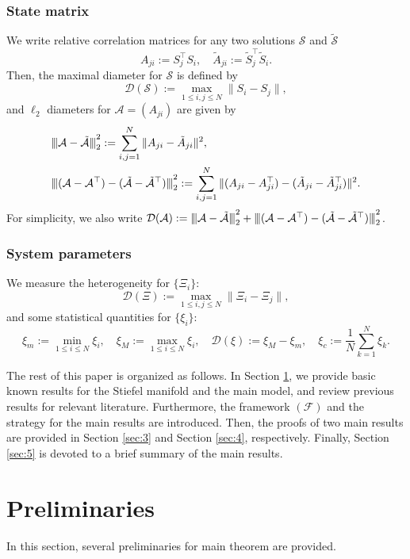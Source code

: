 \documentclass[11pt,reqno]{amsart}
\numberwithin{figure}{section}
\newcommand{\opnorm}[1]{{ \vert\kern-0.25ex \vert\kern-0.25ex \vert #1 
     \vert\kern-0.25ex \vert\kern-0.25ex \vert}}
\begin{document}
\subsubsection{State matrix} We write relative correlation matrices  for any two solutions $\mathcal S$ and $\tilde{\mathcal S}$
\[
A_{ji} := S_j^\top S_i,\quad \tilde A_{ji} := \tilde S_j^\top \tilde S_i.
\]
Then, the maximal diameter for $\mathcal S$ is defined by 
\[
\mathcal D(\mathcal S) := \max_{1\leq i,j \leq N} \|S_i -S_j\|,
\]
and $\ell_2$ diameters for $\mathcal A = (A_{ji})$ are given by
\begin{align*}
&\opnorm{\mathcal A- \tilde{\mathcal A}}_2^2:= \sum_{i,j=1}^N \|A_{ji} - \tilde A_{ji}\|^2, \\
&  \opnorm{(\mathcal A - \mathcal A^\top) - (\tilde{\mathcal A} - \tilde{\mathcal A}^\top)   }_2^2 := \sum_{i,j=1}^N \| (A_{ji} -  A_{ji}^\top) - (\tilde A_{ji} - \tilde A_{ji}^\top)\|^2 .
\end{align*}
For simplicity, we also write $\mathcal D(\mathcal A) := \opnorm{\mathcal A- \tilde{\mathcal A}}_2^2 + \opnorm{(\mathcal A - \mathcal A^\top) - (\tilde{\mathcal A} - \tilde{\mathcal A}^\top)   }_2^2 $.
\subsubsection{System parameters}
We measure the heterogeneity for $\{\Xi_i\}$:
\[
\mathcal D(\Xi) := \max_{1\leq i,j\leq N } \|\Xi_i - \Xi_j\|,
\]
and some statistical quantities for $\{\xi_i\}$:
\[
\xi_m := \min_{1\leq i \leq N} \xi_i,\quad \xi_M := \max_{1\leq i \leq N} \xi_i,\quad \mathcal D(\xi) := \xi_M-\xi_m, \quad \xi_c := \frac1N \sum_{k=1}^N \xi_k.
\]



The rest of this paper is organized as follows. In Section \ref{sec:2}, we provide basic known results for the Stiefel manifold and the main model, and review previous results for relevant literature. Furthermore, the framework $(\mathcal F)$ and the strategy for the main results are introduced. Then, the proofs of two main results are provided in Section \ref{sec:3} and Section \ref{sec:4}, respectively. Finally, Section \ref{sec:5} is devoted to a brief summary of the main results. 

\vspace{0.3cm}


 
\section{Preliminaries} \label{sec:2} 
\setcounter{equation}{0}
In this section,  several preliminaries for main theorem are provided. 
\end{document}
